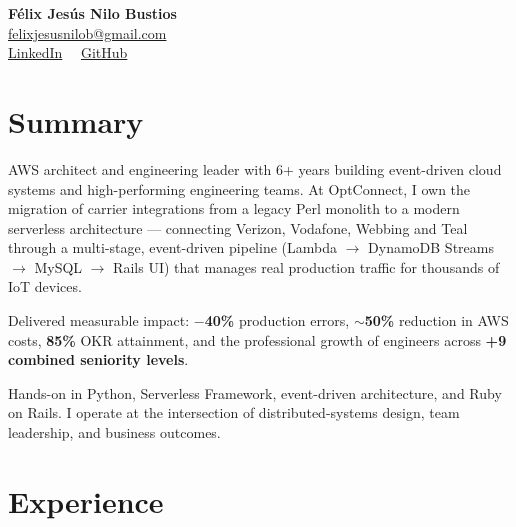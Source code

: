 \documentclass[11pt,a4paper]{article}
\begin{document}
\begin{center}
  {\LARGE\bfseries\color{accent} Félix Jesús Nilo Bustios}\\[4pt]
  {\small
    \href{mailto:felixjesusnilob@gmail.com}{felixjesusnilob@gmail.com}\\
    \href{https://www.linkedin.com/in/felix-nilo}{LinkedIn} \ \textbullet\
    \href{https://github.com/felixnilo}{GitHub}
  }
\end{center}

\section{Summary}

AWS architect and engineering leader with 6+ years building event-driven cloud systems and
high-performing engineering teams. At OptConnect, I own the migration of carrier integrations
from a legacy Perl monolith to a modern serverless architecture --- connecting Verizon, Vodafone,
Webbing and Teal through a multi-stage, event-driven pipeline
(Lambda $\to$ DynamoDB Streams $\to$ MySQL $\to$ Rails UI) that manages real production traffic
for thousands of IoT devices.

Delivered measurable impact: \textbf{$-$40\%} production errors, \textbf{$\sim$50\%} reduction in AWS costs,
\textbf{85\%} OKR attainment, and the professional growth of engineers across \textbf{+9 combined seniority levels}.

Hands-on in Python, Serverless Framework, event-driven architecture, and Ruby on Rails. I operate
at the intersection of distributed-systems design, team leadership, and business outcomes.

\section{Experience}
\end{document}
